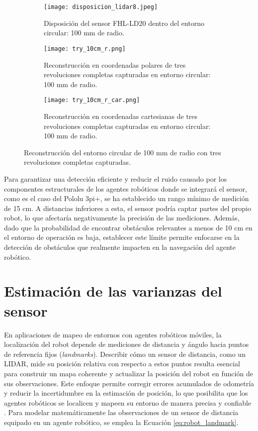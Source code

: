 \begin{figure}[H]
	\centering
	\begin{subfigure}{0.6\textwidth}
		\centering
		\texttt{[image: disposicion\_lidar8.jpeg]}
		\caption{Disposición del sensor FHL-LD20 dentro del entorno circular: 100 mm de radio.}
		\label{disposicion_lidar8}
		\vspace{1em}
	\end{subfigure}
	\begin{subfigure}{0.45\textwidth}
		\centering
		\texttt{[image: try\_10cm\_r.png]}
		\caption{Reconstrucción en coordenadas polares de tres revoluciones completas capturadas en entorno circular: 100 mm de radio.}
		\label{try_10cm_r}
	\end{subfigure}
	\hspace{1em}
	\begin{subfigure}{0.45\textwidth}
		\centering
		\texttt{[image: try\_10cm\_r\_car.png]}
		\caption{Reconstrucción en coordenadas cartesianas de tres revoluciones completas capturadas en entorno circular: 100 mm de radio.}
		\label{try_10cm_r_car}
	\end{subfigure}
	\caption{Reconstrucción del entorno circular de 100 mm de radio con tres revoluciones completas capturadas.}
	\label{fig: reconstrucciones_10}
\end{figure}

Para garantizar una detección eficiente y reducir el ruido causado por los componentes estructurales de los agentes robóticos donde se integrará el sensor, como es el caso del Pololu 3pi+, se ha establecido un rango mínimo de medición de 15 cm. A distancias inferiores a esta, el sensor podría captar partes del propio robot, lo que afectaría negativamente la precisión de las mediciones. Además, dado que la probabilidad de encontrar obstáculos relevantes a menos de 10 cm en el entorno de operación es baja, establecer este límite permite enfocarse en la detección de obstáculos que realmente impacten en la navegación del agente robótico.

\section{Estimación de las varianzas del sensor }
\label{sec:estimacion}
En aplicaciones de mapeo de entornos con agentes robóticos móviles, la localización del robot depende de mediciones de distancia y ángulo hacia puntos de referencia fijos (\textit{landmarks}). Describir cómo un sensor de distancia, como un LIDAR, mide su posición relativa con respecto a estos puntos resulta esencial para construir un mapa coherente y actualizar la posición del robot en función de sus observaciones. Este enfoque permite corregir errores acumulados de odometría y reducir la incertidumbre en la estimación de posición, lo que posibilita que los agentes robóticos se localicen y mapeen su entorno de manera precisa y confiable \cite{corke_robotics_2017}. Para modelar matemáticamente las observaciones de un sensor de distancia equipado en un agente robótico, se emplea la Ecuación \eqref{eq:robot_landmark}.

